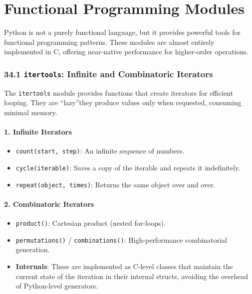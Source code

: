 \hypertarget{functional-programming-modules}{%
\chapter{Functional Programming
Modules}\label{functional-programming-modules}}

Python is not a purely functional language, but it provides powerful
tools for functional programming patterns. These modules are almost
entirely implemented in C, offering near-native performance for
higher-order operations.

\hypertarget{itertools-infinite-and-combinatoric-iterators}{%
\subsection{\texorpdfstring{34.1 \texttt{itertools}: Infinite and
Combinatoric
Iterators}{34.1 itertools: Infinite and Combinatoric Iterators}}\label{itertools-infinite-and-combinatoric-iterators}}

The \passthrough{\lstinline!itertools!} module provides functions that
create iterators for efficient looping. They are ``lazy''they produce
values only when requested, consuming minimal memory.

\hypertarget{infinite-iterators}{%
\subsubsection{1. Infinite Iterators}\label{infinite-iterators}}

\begin{itemize}
\tightlist
\item
  \passthrough{\lstinline!count(start, step)!}: An infinite sequence of
  numbers.
\item
  \passthrough{\lstinline!cycle(iterable)!}: Saves a copy of the
  iterable and repeats it indefinitely.
\item
  \passthrough{\lstinline!repeat(object, times)!}: Returns the same
  object over and over.
\end{itemize}

\hypertarget{combinatoric-iterators}{%
\subsubsection{2. Combinatoric Iterators}\label{combinatoric-iterators}}

\begin{itemize}
\tightlist
\item
  \passthrough{\lstinline!product()!}: Cartesian product (nested
  for-loops).
\item
  \passthrough{\lstinline!permutations()!} /
  \passthrough{\lstinline!combinations()!}: High-performance
  combinatorial generation.
\item
  \textbf{Internals}: These are implemented as C-level classes that
  maintain the current state of the iteration in their internal structs,
  avoiding the overhead of Python-level generators.
\end{itemize}

